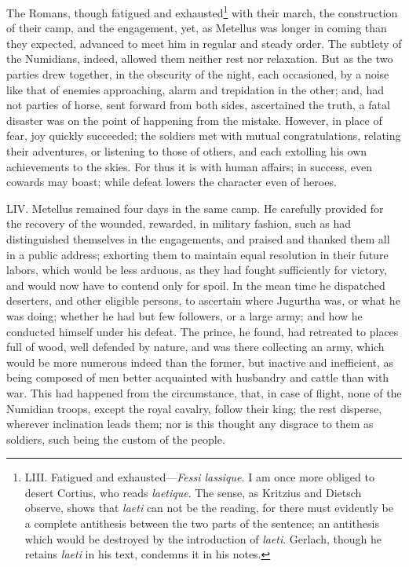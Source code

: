 The Romans, though fatigued and exhausted\footnote{LIII. Fatigued and exhausted—\emph{Fessi lassique.} I am once more
obliged to desert Cortius, who reads \emph{laetique}. The sense, as Kritzius
and Dietsch observe, shows that \emph{laeti} can not be the reading, for
there must evidently be a complete antithesis between the two parts of
the sentence; an antithesis which would be destroyed by the introduction
of \emph{laeti}. Gerlach, though he retains \emph{laeti} in his text, condemns it
in his notes.} with their march, the
construction of their camp, and the engagement, yet, as Metellus was
longer in coming than they expected, advanced to meet him in regular
and steady order. The subtlety of the Numidians, indeed, allowed them
neither rest nor relaxation. But as the two parties drew together, in
the obscurity of the night, each occasioned, by a noise like that of
enemies approaching, alarm and trepidation in the other; and, had not
parties of horse, sent forward from both sides, ascertained the truth,
a fatal disaster was on the point of happening from the mistake.
However, in place of fear, joy quickly succeeded; the soldiers met
with mutual congratulations, relating their adventures, or listening
to those of others, and each extolling his own achievements to the
skies. For thus it is with human affairs; in success, even cowards may
boast; while defeat lowers the character even of heroes.

LIV. Metellus remained four days in the same camp. He carefully
provided for the recovery of the wounded, rewarded, in military
fashion, such as had distinguished themselves in the engagements, and
praised and thanked them all in a public address; exhorting them to
maintain equal resolution in their future labors, which would be less
arduous, as they had fought sufficiently for victory, and would now
have to contend only for spoil. In the mean time he dispatched
deserters, and other eligible persons, to ascertain where Jugurtha
was, or what he was doing; whether he had but few followers, or a
large army; and how he conducted himself under his defeat. The prince,
he found, had retreated to places full of wood, well defended by
nature, and was there collecting an army, which would be more numerous
indeed than the former, but inactive and inefficient, as being
composed of men better acquainted with husbandry and cattle than with
war. This had happened from the circumstance, that, in case of flight,
none of the Numidian troops, except the royal cavalry, follow their
king; the rest disperse, wherever inclination leads them; nor is this
thought any disgrace to them as soldiers, such being the custom of the
people.

